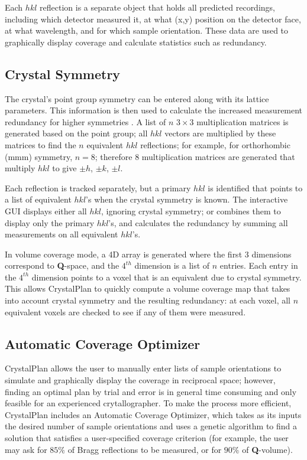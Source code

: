 \documentclass[final]{iucr}              %
\begin{document}
Each $hkl$ reflection is a separate object that holds all predicted
recordings, including which detector measured it, at what (x,y) position on the
detector face, at what wavelength, and for which sample orientation. These data
are used to graphically display coverage and calculate statistics such as
redundancy. 



\subsection{Crystal Symmetry}
\label{sec:symm}
The crystal's point group symmetry can
be entered along with its lattice parameters.
This information is then used to
calculate the increased measurement redundancy for higher symmetries
\cite{giacovazzo92}. 
A list of $n$ $3\times3$ multiplication matrices is generated based on the point group; 
all $hkl$ vectors are multiplied by
these matrices to find the $n$ equivalent $hkl$ reflections; for example, for
orthorhombic (mmm) symmetry, $n=8$; therefore 8 multiplication matrices are
generated that multiply $hkl$ to give $\pm h$, $\pm k$, $\pm l$.              

Each reflection is tracked separately, but a primary
$hkl$ is identified that points to a list of equivalent $hkl$'s when the
crystal symmetry is known.
The interactive GUI displays either all $hkl$, ignoring crystal symmetry; or
combines them to display only the primary $hkl$'s, and calculates the
redundancy by summing all measurements on all equivalent $hkl$'s.

In volume coverage mode, a 4D array is generated where the first 3 dimensions
correspond to {\bf Q}-space, and the $4^{th}$ dimension is a list of $n$
entries. Each entry in the $4^{th}$ dimension points to a voxel that is an
equivalent due to crystal symmetry. This allows CrystalPlan to quickly compute a volume coverage
map that takes into account crystal symmetry and the resulting redundancy: at
each voxel, all $n$ equivalent voxels are checked to see if any of them were
measured.



\subsection{Automatic Coverage Optimizer}

CrystalPlan allows the user to manually enter lists of sample orientations to
simulate and graphically display the coverage in reciprocal space;
however, finding an optimal plan by trial and error is in general 
time consuming and only feasible for an experienced crytallographer.
To make the process more efficient, CrystalPlan includes an Automatic
Coverage Optimizer, which takes as its inputs the desired number of sample
orientations and uses a genetic algorithm to find a solution that satisfies a
user-specified coverage criterion (for example, the user may ask for $85\%$ of 
Bragg reflections to be measured, or for $90\%$ of {\bf Q}-volume). 
\end{document}
